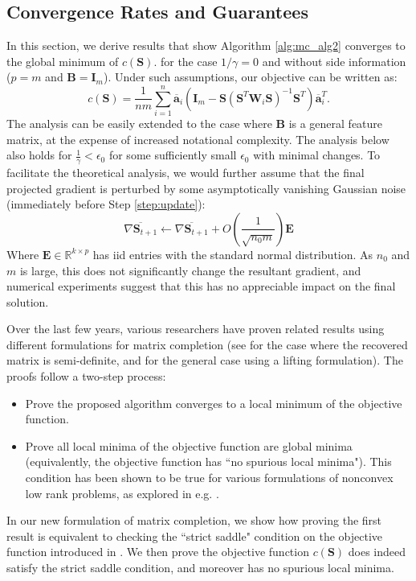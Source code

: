 \documentclass[twoside,11pt]{article}
\newcommand{\md}[1]{\mathbb{#1}}
\begin{document}
\subsection{Convergence Rates and Guarantees}
\label{subsec:convergence}
In this section, we  derive results that show  Algorithm \ref{alg:mc_alg2} converges to the global minimum 
of $c(\bm{S})$. for the case  $1/\gamma=0$ and  without side information ($p=m$ and $\bm{B}=\bm{I}_m$). Under such assumptions,  our objective can be written as:
\[c(\bm{S})=\frac{1}{nm}\sum_{i=1}^n  \overline{\bm{a}}_i
\left(\bm{I}_m-\bm{S}\left(\bm{S}^T\bm{W}_i\bm{S}\right)^{-1}\bm{S}^T\right)\overline{\bm{a}}_i^T.\]
The analysis  can be easily extended to the case where $\bm{B}$ is a general feature matrix, at the expense of increased notational complexity. The analysis below also holds for $\frac{1}{\gamma}<\epsilon_0$ for some sufficiently small $\epsilon_0$ with minimal changes. To facilitate the theoretical analysis, we would further assume that the final projected gradient is perturbed by some asymptotically vanishing Gaussian noise (immediately before Step \ref{step:update}):
\[\overline{\nabla \bm{S}_{t+1}} \gets \overline{\nabla \bm{S}_{t+1}} + O\left(\frac{1}{\sqrt{n_0m}}\right)\bm{E}\]
Where $\bm{E}\in \md{R}^{k \times p}$ has iid entries with the standard normal distribution. As $n_0$ and $m$ is large, this does not significantly change the resultant gradient, and numerical experiments suggest that this has no appreciable impact on the final solution. 

Over the last few years, various researchers have proven related results using different formulations for matrix completion (see  \cite{ge2016matrix,ma2019implicit} for the case where the recovered matrix is semi-definite, and \cite{zheng2016convergence} for the general case using a lifting formulation). The proofs  follow a two-step process:
\begin{itemize}
	\item Prove the proposed algorithm converges to a local minimum of the objective function.
	\item Prove all local minima of the objective function are global minima (equivalently, the objective function has ``no spurious local minima"). This condition has been shown to be true for various formulations of nonconvex low rank problems, as explored in e.g. \cite{ge2017no}. 
\end{itemize}
In our new formulation of matrix completion, we  show how proving the first result is equivalent to checking the ``strict saddle" condition on the objective function introduced in \cite{ge2015escaping}. We  then prove the objective function $c(\bm{S})$ does indeed satisfy the strict saddle condition, and moreover has no spurious local minima. 
\end{document}
